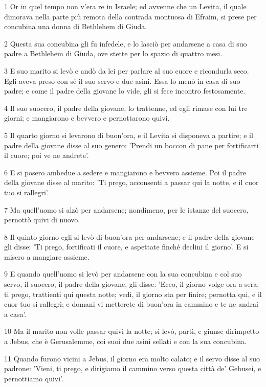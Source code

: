 \par 1 Or in quel tempo non v'era re in Israele; ed avvenne che un Levita, il quale dimorava nella parte più remota della contrada montuosa di Efraim, si prese per concubina una donna di Bethlehem di Giuda.
\par 2 Questa sua concubina gli fu infedele, e lo lasciò per andarsene a casa di suo padre a Bethlehem di Giuda, ove stette per lo spazio di quattro mesi.
\par 3 E suo marito si levò e andò da lei per parlare al suo cuore e ricondurla seco. Egli aveva preso con sé il suo servo e due asini. Essa lo menò in casa di suo padre; e come il padre della giovane lo vide, gli si fece incontro festosamente.
\par 4 Il suo suocero, il padre della giovane, lo trattenne, ed egli rimase con lui tre giorni; e mangiarono e bevvero e pernottarono quivi.
\par 5 Il quarto giorno si levarono di buon'ora, e il Levita si disponeva a partire; e il padre della giovane disse al suo genero: 'Prendi un boccon di pane per fortificarti il cuore; poi ve ne andrete'.
\par 6 E si posero ambedue a sedere e mangiarono e bevvero assieme. Poi il padre della giovane disse al marito: 'Ti prego, acconsenti a passar qui la notte, e il cuor tuo si rallegri'.
\par 7 Ma quell'uomo si alzò per andarsene; nondimeno, per le istanze del suocero, pernottò quivi di nuovo.
\par 8 Il quinto giorno egli si levò di buon'ora per andarsene; e il padre della giovane gli disse: 'Ti prego, fortificati il cuore, e aspettate finché declini il giorno'. E si misero a mangiare assieme.
\par 9 E quando quell'uomo si levò per andarsene con la sua concubina e col suo servo, il suocero, il padre della giovane, gli disse: 'Ecco, il giorno volge ora a sera; ti prego, trattienti qui questa notte; vedi, il giorno sta per finire; pernotta qui, e il cuor tuo si rallegri; e domani vi metterete di buon'ora in cammino e te ne andrai a casa'.
\par 10 Ma il marito non volle passar quivi la notte; si levò, partì, e giunse dirimpetto a Jebus, che è Gerusalemme, coi suoi due asini sellati e con la sua concubina.
\par 11 Quando furono vicini a Jebus, il giorno era molto calato; e il servo disse al suo padrone: 'Vieni, ti prego, e dirigiamo il cammino verso questa città de' Gebusei, e pernottiamo quivi'.
